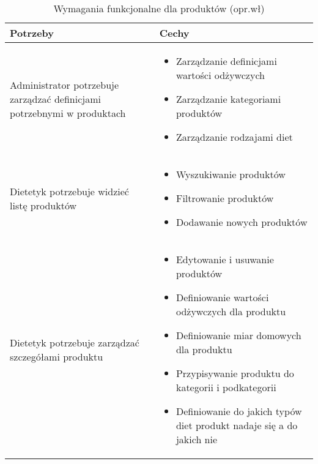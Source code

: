 \begin{minipage}{\textwidth}
    \begin{table}[H]
        \centering\caption{Wymagania funkcjonalne dla produktów (opr.wł)\label{tabela:wymaganiaFunkcjonalneProdukty}}
        \begin{tabular}{|P{.3\textwidth}|P{.6\textwidth}|}
            \hline
            Potrzeby & Cechy \\

            \hline
            Administrator potrzebuje zarządzać definicjami potrzebnymi w produktach &
            \begin{itemize}
                \item Zarządzanie definicjami wartości odżywczych
                \item Zarządzanie kategoriami produktów
                \item Zarządzanie rodzajami diet
            \end{itemize} \\
            \hline
            Dietetyk potrzebuje widzieć listę produktów &
            \begin{itemize}
                \item Wyszukiwanie produktów
                \item Filtrowanie produktów
                \item Dodawanie nowych produktów
            \end{itemize} \\
            \hline
            Dietetyk potrzebuje zarządzać szczegółami produktu &
            \begin{itemize}
                \item Edytowanie i usuwanie produktów
                \item Definiowanie wartości odżywczych dla produktu
                \item Definiowanie miar domowych dla produktu
                \item Przypisywanie produktu do kategorii i podkategorii
                \item Definiowanie do jakich typów diet produkt nadaje się a do jakich nie
            \end{itemize} \\
            \hline
        \end{tabular}
    \end{table}
\end{minipage}

